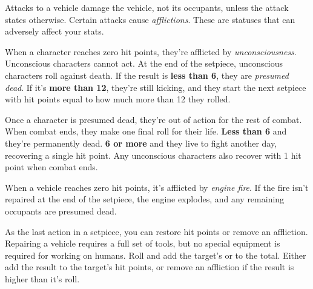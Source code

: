 
Attacks to a vehicle damage the vehicle, not its occupants, unless the attack states otherwise. Certain attacks cause \emph{afflictions}. These are statuses that can adversely affect your stats.

When a character reaches zero hit points, they're afflicted by \emph{unconsciousness}. Unconscious characters cannot act. At the end of the setpiece, unconscious characters roll  against death. If the result is \textbf{less than 6}, they are \emph{presumed dead}. If it's \textbf{more than 12}, they're still kicking, and they start the next setpiece with hit points equal to how much more than 12 they rolled.

Once a character is presumed dead, they're out of action for the rest of combat. When combat ends, they make one final  roll for their life. \textbf{Less than 6} and they're permanently dead. \textbf{6 or more} and they live to fight another day, recovering a single hit point. Any unconscious characters also recover with 1 hit point when combat ends.

When a vehicle reaches zero hit points, it's afflicted by \emph{engine fire}. If the fire isn't repaired at the end of the setpiece, the engine explodes, and any remaining occupants are presumed dead.

As the last action in a setpiece, you can restore hit points or remove an affliction. Repairing a vehicle requires a full set of tools, but no special equipment is required for working on humans. Roll  and add the target's  or  to the total. Either add the result to the target's hit points, or remove an affliction if the result is higher than it's  roll.
